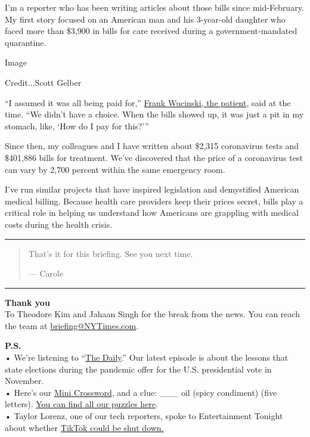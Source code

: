 I'm a reporter who has been writing articles about those bills since
mid-February. My first story focused on an American man and his
3-year-old daughter who faced more than \$3,900 in bills for care
received during a government-mandated quarantine.

Image

Credit...Scott Gelber

``I assumed it was all being paid for,''
\href{https://www.nytimes3xbfgragh.onion/2020/02/29/upshot/coronavirus-surprise-medical-bills.html}{Frank
Wucinski, the patient}, said at the time. ``We didn't have a choice.
When the bills showed up, it was just a pit in my stomach, like, `How do
I pay for this?'''

Since then, my colleagues and I have written about \$2,315 coronavirus
tests and \$401,886 bills for treatment. We've discovered that the price
of a coronavirus test can vary by 2,700 percent within the same
emergency room.

I've run similar projects that have inspired legislation and demystified
American medical billing. Because health care providers keep their
prices secret, bills play a critical role in helping us understand how
Americans are grappling with medical costs during the health crisis.

\begin{center}\rule{0.5\linewidth}{\linethickness}\end{center}

\begin{quote}
That's it for this briefing. See you next time.

--- Carole
\end{quote}

\begin{center}\rule{0.5\linewidth}{\linethickness}\end{center}

\textbf{Thank you}\\
To Theodore Kim and Jahaan Singh for the break from the news. You can
reach the team at
\href{mailto:briefing+pm@NYTimes.com?subject=Briefing\%20Feedback}{briefing@NYTimes.com}.

\textbf{P.S.}\\
• We're listening to
``\href{https://www.nytimes3xbfgragh.onion/thedaily}{The Daily}.'' Our
latest episode is about the lessons that state elections during the
pandemic offer for the U.S. presidential vote in November.\\
• Here's our
\href{https://www.nytimes3xbfgragh.onion/crosswords/game/mini}{Mini
Crossword}, and a clue: \_\_\_ oil (spicy condiment) (five letters).
\href{https://www.nytimes3xbfgragh.onion/crosswords}{You can find all
our puzzles here}.\\
• Taylor Lorenz, one of our tech reporters, spoke to Entertainment
Tonight about whether
\href{https://www.etonline.com/could-tiktok-really-get-shut-down-heres-what-you-need-to-know-150710}{TikTok
could be shut down.}

